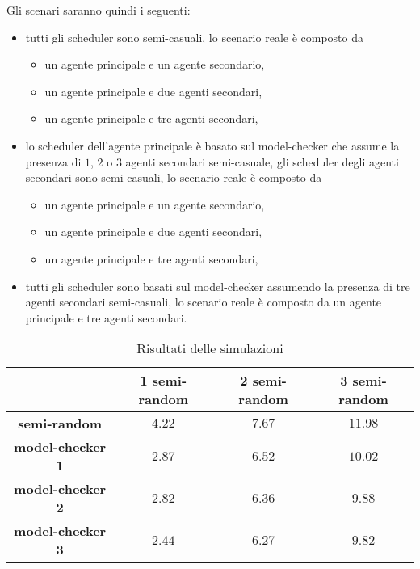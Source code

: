 Gli scenari saranno quindi i seguenti:
\begin{itemize}
	\item tutti gli scheduler sono semi-casuali, lo scenario reale è composto da
	\begin{itemize}
		\item un agente principale e un agente secondario,
		\item un agente principale e due agenti secondari,
		\item un agente principale e tre agenti secondari,
	\end{itemize}
	\item lo scheduler dell'agente principale è basato sul model-checker che assume la presenza di $1$, $2$ o $3$ agenti secondari semi-casuale, gli scheduler degli agenti secondari sono semi-casuali, lo scenario reale è composto da
	\begin{itemize}
		\item un agente principale e un agente secondario,
		\item un agente principale e due agenti secondari,
		\item un agente principale e tre agenti secondari,
	\end{itemize}
	\item tutti gli scheduler sono basati sul model-checker assumendo la presenza di tre agenti secondari semi-casuali, lo scenario reale è composto da un agente principale e tre agenti secondari.
\end{itemize}

\begin{table}
	\begin{tabular}{|c||c|c|c|}
	\hline
	& \textbf{1 semi-random} & \textbf{2 semi-random} & \textbf{3 semi-random} \\
	\hline
	\hline
	\textbf{semi-random} & $4.22$ & $7.67$ & $11.98$ \\
	\hline
	\textbf{model-checker 1} & $2.87$ & $6.52$ & $10.02$ \\
	\hline
	\textbf{model-checker 2} & $2.82$ & $6.36$ & $9.88$ \\
	\hline
	\textbf{model-checker 3} & $2.44$ & $6.27$ & $9.82$ \\
	\hline
	\end{tabular}
	\caption{Risultati delle simulazioni}
	\label{tab:sim_results}
\end{table}

